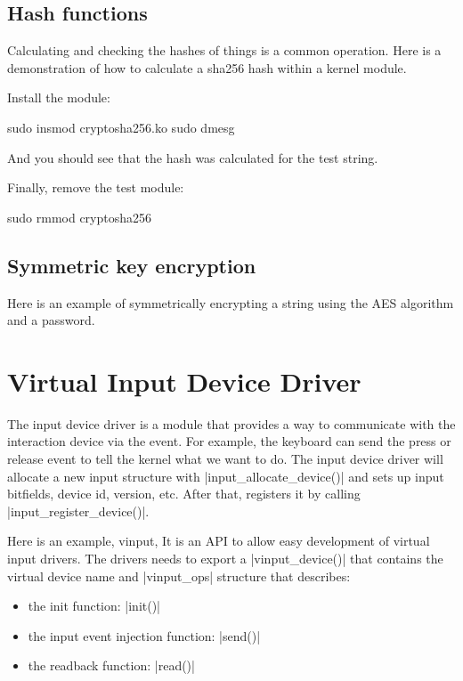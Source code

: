 \documentclass[10pt, oneside]{book}
\begin{document}
\subsection{Hash functions}
\label{sec:hashfunc}

Calculating and checking the hashes of things is a common operation.
Here is a demonstration of how to calculate a sha256 hash within a kernel module.


Install the module:

\begin{codebash}
sudo insmod cryptosha256.ko
sudo dmesg
\end{codebash}

And you should see that the hash was calculated for the test string.

Finally, remove the test module:

\begin{codebash}
sudo rmmod cryptosha256
\end{codebash}

\subsection{Symmetric key encryption}
\label{sec:org2fab20b}
Here is an example of symmetrically encrypting a string using the AES algorithm and a password.


\section{Virtual Input Device Driver}
\label{sec:vinput}
The input device driver is a module that provides a way to communicate with the interaction device via the event.
For example, the keyboard can send the press or release event to tell the kernel what we want to do.
The input device driver will allocate a new input structure with \cpp|input_allocate_device()| and sets up input bitfields, device id, version, etc.
After that, registers it by calling \cpp|input_register_device()|.

Here is an example, vinput,
It is an API to allow easy development of virtual input drivers.
The drivers needs to export a \cpp|vinput_device()| that contains the virtual device name and \cpp|vinput_ops| structure that describes:

\begin{itemize}
    \item the init function: \cpp|init()|
    \item the input event injection function: \cpp|send()|
    \item the readback function: \cpp|read()|
\end{itemize}
\end{document}
